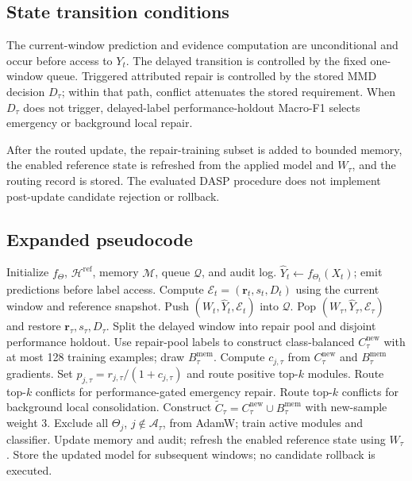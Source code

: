 \subsection{State transition conditions}
The current-window prediction and evidence computation are unconditional and occur before access to $Y_t$. The delayed transition is controlled by the fixed one-window queue. Triggered attributed repair is controlled by the stored MMD decision $D_{\tau}$; within that path, conflict attenuates the stored requirement. When $D_{\tau}$ does not trigger, delayed-label performance-holdout Macro-F1 selects emergency or background local repair.

After the routed update, the repair-training subset is added to bounded memory, the enabled reference state is refreshed from the applied model and $W_{\tau}$, and the routing record is stored. The evaluated DASP procedure does not implement post-update candidate rejection or rollback.

\subsection{Expanded pseudocode}
\begin{algorithmic}[1]
\STATE Initialize $f_{\Theta}$, $\mathcal H^{\mathrm{ref}}$, memory $\mathcal M$, queue $\mathcal Q$, and audit log.
  \STATE $\hat Y_t\leftarrow f_{\Theta_t}(X_t)$; emit predictions before label access.
  \STATE Compute $\mathcal E_t=(\mathbf r_t,s_t,D_t)$ using the current window and reference snapshot.
  \STATE Push $(W_t,\hat Y_t,\mathcal E_t)$ into $\mathcal Q$.
    \STATE Pop $(W_{\tau},\hat Y_{\tau},\mathcal E_{\tau})$ and restore $\mathbf r_{\tau},s_{\tau},D_{\tau}$.
    \STATE Split the delayed window into repair pool and disjoint performance holdout.
    \STATE Use repair-pool labels to construct class-balanced $C_{\tau}^{\mathrm{new}}$ with at most 128 training examples; draw $B_{\tau}^{\mathrm{mem}}$.
    \STATE Compute $c_{j,\tau}$ from $C_{\tau}^{\mathrm{new}}$ and $B_{\tau}^{\mathrm{mem}}$ gradients.
      \STATE Set $p_{j,\tau}=r_{j,\tau}/(1+c_{j,\tau})$ and route positive top-$k$ modules.
      \STATE Route top-$k$ conflicts for performance-gated emergency repair.
    \ELSE
      \STATE Route top-$k$ conflicts for background local consolidation.
    \ENDIF
    \STATE Construct $\widetilde C_{\tau}=C_{\tau}^{\mathrm{new}}\cup B_{\tau}^{\mathrm{mem}}$ with new-sample weight 3.
    \STATE Exclude all $\Theta_j$, $j\notin\mathcal A_{\tau}$, from AdamW; train active modules and classifier.
    \STATE Update memory and audit; refresh the enabled reference state using $W_{\tau}$.
    \STATE Store the updated model for subsequent windows; no candidate rollback is executed.
  \ENDIF
\ENDFOR
\end{algorithmic}


